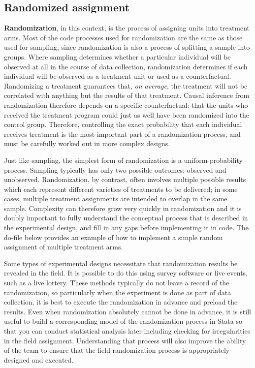 \subsection{Randomized assignment}

\textbf{Randomization}, in this context, is the process of assigning units into treatment arms.
Most of the code processes used for randomization are the same as those used for sampling,
since randomization is also a process of splitting a sample into groups.
Where sampling determines whether a particular individual
will be observed at all in the course of data collection,
randomization determines if each individual will be observed
as a treatment unit or used as a counterfactual.
Randomizing a treatment guarantees that, \textit{on average},
the treatment will not be correlated with anything but the results of that treatment.\cite{duflo2007using}
Causal inference from randomization therefore depends on a specific counterfactual:
that the units who received the treatment program
could just as well have been randomized into the control group.
Therefore, controlling the exact probability that each individual receives treatment
is the most important part of a randomization process,
and must be carefully worked out in more complex designs.

Just like sampling, the simplest form of randomization is a uniform-probability process.
Sampling typically has only two possible outcomes: observed and unobserved.
Randomization, by contrast, often involves multiple possible results
which each represent different varieties of treatments to be delivered;
in some cases, multiple treatment assignments are intended to overlap in the same sample.
Complexity can therefore grow very quickly in randomization
and it is doubly important to fully understand the conceptual process
that is described in the experimental design,
and fill in any gaps before implementing it in code.
The do-file below provides an example of how to implement a simple random assignment of multiple treatment arms. 


Some types of experimental designs necessitate that randomization results be revealed in the field.
It is possible to do this using survey software or live events, such as a live lottery.
These methods typically do not leave a record of the randomization,
so particularly when the experiment is done as part of data collection,
it is best to execute the randomization in advance and preload the results.
Even when randomization absolutely cannot be done in advance, it is still useful
to build a corresponding model of the randomization process in Stata
so that you can conduct statistical analysis later
including checking for irregularities in the field assignment.
Understanding that process will also improve the ability of the team
to ensure that the field randomization process is appropriately designed and executed.


